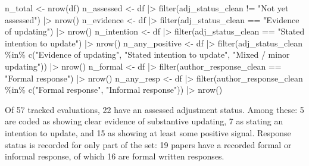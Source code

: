 \documentclass[
  11pt,
  letterpaper,
]{article}
\newenvironment{Shaded}{\begin{snugshade}}{\end{snugshade}}
\newcommand{\FunctionTok}[1]{\textcolor[rgb]{0.28,0.35,0.67}{#1}}
\newcommand{\NormalTok}[1]{\textcolor[rgb]{0.00,0.23,0.31}{#1}}
\newcommand{\OtherTok}[1]{\textcolor[rgb]{0.00,0.23,0.31}{#1}}
\newcommand{\SpecialCharTok}[1]{\textcolor[rgb]{0.37,0.37,0.37}{#1}}
\newcommand{\StringTok}[1]{\textcolor[rgb]{0.13,0.47,0.30}{#1}}
\begin{document}
\begin{Shaded}
\begin{Highlighting}[]
\NormalTok{n\_total      }\OtherTok{\textless{}{-}} \FunctionTok{nrow}\NormalTok{(df)}
\NormalTok{n\_assessed   }\OtherTok{\textless{}{-}}\NormalTok{ df }\SpecialCharTok{|\textgreater{}} \FunctionTok{filter}\NormalTok{(adj\_status\_clean }\SpecialCharTok{!=} \StringTok{"Not yet assessed"}\NormalTok{) }\SpecialCharTok{|\textgreater{}} \FunctionTok{nrow}\NormalTok{()}
\NormalTok{n\_evidence   }\OtherTok{\textless{}{-}}\NormalTok{ df }\SpecialCharTok{|\textgreater{}} \FunctionTok{filter}\NormalTok{(adj\_status\_clean }\SpecialCharTok{==} \StringTok{"Evidence of updating"}\NormalTok{) }\SpecialCharTok{|\textgreater{}} \FunctionTok{nrow}\NormalTok{()}
\NormalTok{n\_intention  }\OtherTok{\textless{}{-}}\NormalTok{ df }\SpecialCharTok{|\textgreater{}} \FunctionTok{filter}\NormalTok{(adj\_status\_clean }\SpecialCharTok{==} \StringTok{"Stated intention to update"}\NormalTok{) }\SpecialCharTok{|\textgreater{}} \FunctionTok{nrow}\NormalTok{()}
\NormalTok{n\_any\_positive }\OtherTok{\textless{}{-}}\NormalTok{ df }\SpecialCharTok{|\textgreater{}}
  \FunctionTok{filter}\NormalTok{(adj\_status\_clean }\SpecialCharTok{\%in\%} \FunctionTok{c}\NormalTok{(}\StringTok{"Evidence of updating"}\NormalTok{,}
                                  \StringTok{"Stated intention to update"}\NormalTok{,}
                                  \StringTok{"Mixed / minor updating"}\NormalTok{)) }\SpecialCharTok{|\textgreater{}} \FunctionTok{nrow}\NormalTok{()}
\NormalTok{n\_formal  }\OtherTok{\textless{}{-}}\NormalTok{ df }\SpecialCharTok{|\textgreater{}} \FunctionTok{filter}\NormalTok{(author\_response\_clean }\SpecialCharTok{==} \StringTok{"Formal response"}\NormalTok{) }\SpecialCharTok{|\textgreater{}} \FunctionTok{nrow}\NormalTok{()}
\NormalTok{n\_any\_resp }\OtherTok{\textless{}{-}}\NormalTok{ df }\SpecialCharTok{|\textgreater{}}
  \FunctionTok{filter}\NormalTok{(author\_response\_clean }\SpecialCharTok{\%in\%} \FunctionTok{c}\NormalTok{(}\StringTok{"Formal response"}\NormalTok{, }\StringTok{"Informal response"}\NormalTok{)) }\SpecialCharTok{|\textgreater{}} \FunctionTok{nrow}\NormalTok{()}
\end{Highlighting}
\end{Shaded}

Of 57 tracked evaluations, 22 have an assessed adjustment status. Among
these: 5 are coded as showing clear evidence of substantive updating, 7
as stating an intention to update, and 15 as showing at least some
positive signal. Response status is recorded for only part of the set:
19 papers have a recorded formal or informal response, of which 16 are
formal written responses.
\end{document}
